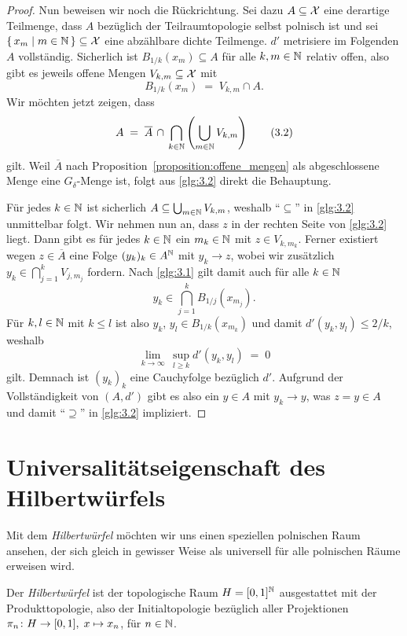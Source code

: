 \documentclass[../thesis/thesis.tex]{subfiles}
\begin{document}
\begin{proof}
		Nun beweisen wir noch die Rückrichtung. Sei dazu $A \subseteq \mathcal{X}$ eine derartige Teilmenge, dass
		$A$ bezüglich der Teilraumtopologie selbst polnisch ist und sei $\left\{\, x_m \; \middle| \; m \in \mathbb{N} \,\right\} \subseteq \mathcal{X}$ eine abzählbare dichte Teilmenge. 
		$d'$ metrisiere im Folgenden 
		$A$ vollständig.
		Sicherlich ist $B_{1/k}(x_m) \subseteq A$ für alle 
		$k, m \in \mathbb{N}$ relativ offen, also gibt es jeweils offene Mengen 
		$V_{k, m} \subseteq \mathcal{X}$ mit
		\[ B_{1/k}(x_m) \; = \; V_{k, m} 
		\cap A \text{.} \label{glg:3.1} \tag{3.1}\]
		Wir möchten jetzt zeigen, dass
		\[ A \; = \; \overline{A} \, \cap \, 
		\bigcap_{k \in \mathbb{N}} \left( \bigcup_{m \in \mathbb{N}} V_{k, m} \right) 
		\label{glg:3.2} \tag{3.2}\]
		gilt. 
		Weil $\overline{A}$ nach Proposition~\ref{proposition:offene_mengen} 
		als abgeschlossene Menge eine $G_\delta$-Menge ist, 
		folgt aus \eqref{glg:3.2} direkt die Behauptung.
		
		Für jedes $k \in \mathbb{N}$ ist sicherlich $A \subseteq 
		\bigcup_{m \in \mathbb{N}} V_{k, m}$, weshalb \enquote{$\subseteq$} 
		in \eqref{glg:3.2} unmittelbar folgt.
		Wir nehmen nun an, dass $z$ in der rechten Seite von \eqref{glg:3.2} liegt. 
		Dann gibt es für jedes $k \in \mathbb{N}$ ein $m_k \in \mathbb{N}$ mit $z \in V_{k, m_k}$. 
		Ferner existiert wegen $z \in \overline{A}$ eine Folge $(y_k)_k \in A^{\mathbb{N}}$ 
		mit $y_k \to z$, wobei wir zusätzlich
		$y_k \in \bigcap_{j=1}^{k} V_{j, m_j}$
		fordern. Nach \eqref{glg:3.1} gilt damit auch für alle $k \in \mathbb{N}$
		\[y_k \in \bigcap_{j=1}^{k} B_{1/j}(x_{m_j}) \text{.} \]
		Für $k, l \in \mathbb{N}$ mit $k \leq l$ ist also $y_k$, $y_l \in B_{1/k}(x_{m_k})$ und damit $d'(y_k, y_l) \leq 2/k$, weshalb 
		\[ \lim_{k \to \infty} \, \sup_{l \geq k} d'(y_k, y_l) \; = \; 0 \]
		gilt. Demnach ist $(y_k)_k$ eine Cauchyfolge bezüglich $d'$. Aufgrund der Vollständigkeit von 
		$(A, d')$ gibt es also ein $y \in A$ mit $y_k \to y$, was 
		$z = y \in A$ und damit \enquote{$\supseteq$} 
		in \eqref{glg:3.2} impliziert.
	\end{proof}

	\section{Universalitätseigenschaft des Hilbertwürfels}
	
	Mit dem \emph{Hilbertwürfel} möchten wir uns einen speziellen polnischen Raum ansehen, 
	der sich gleich in gewisser Weise als universell für alle polnischen Räume erweisen wird.
	
	\begin{Definition}[Hilbertwürfel]
		Der \emph{Hilbertwürfel} ist der topologische Raum $H = [0, 1]^{\mathbb{N}}$ 
		ausgestattet mit der Produkttopologie, also der Initialtopologie bezüglich 
		aller Projektionen $\pi_n \colon H \to [0, 1], \; x \mapsto x_n $, für $n \in \mathbb{N}$.
	\end{Definition}
	
\end{document}
